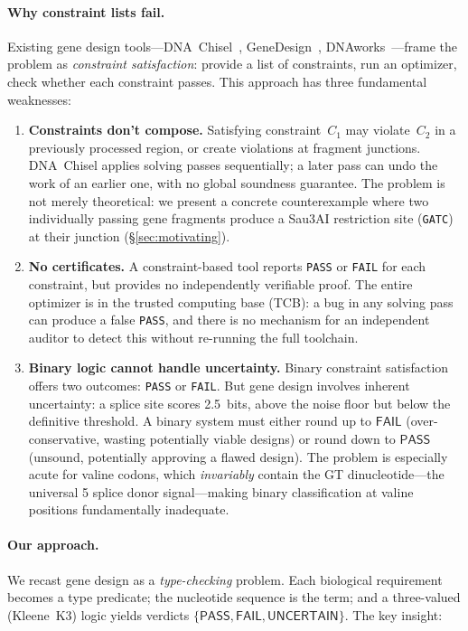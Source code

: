 \documentclass[acmsmall,review,anonymous]{acmart}
\newcommand{\PASS}{\ensuremath{\mathsf{PASS}}\xspace}
\newcommand{\FAIL}{\ensuremath{\mathsf{FAIL}}\xspace}
\newcommand{\UNCERTAIN}{\ensuremath{\mathsf{UNCERTAIN}}\xspace}
\begin{document}
\paragraph{Why constraint lists fail.}
Existing gene design tools---DNA~Chisel~\cite{piret2020dnachisel},
GeneDesign~\cite{richardson2006genedesign},
DNAworks~\cite{vandenbergh2015dnaworks}---frame the problem as
\emph{constraint satisfaction}: provide a list of constraints, run an
optimizer, check whether each constraint passes.
This approach has three fundamental weaknesses:

\begin{enumerate}[leftmargin=*,itemsep=1pt,topsep=2pt]
\item \textbf{Constraints don't compose.}
Satisfying constraint~$C_1$ may violate~$C_2$ in a previously
processed region, or create violations at fragment junctions.
DNA~Chisel applies solving passes sequentially; a later pass can undo
the work of an earlier one, with no global soundness guarantee.
The problem is not merely theoretical: we present a concrete
counterexample where two individually passing gene fragments produce a
Sau3AI restriction site (\texttt{GATC}) at their junction
(\S\ref{sec:motivating}).

\item \textbf{No certificates.}
A constraint-based tool reports \texttt{PASS} or \texttt{FAIL} for
each constraint, but provides no independently verifiable proof.
The entire optimizer is in the trusted computing base (TCB): a bug in
any solving pass can produce a false \texttt{PASS}, and there is no
mechanism for an independent auditor to detect this without re-running
the full toolchain.

\item \textbf{Binary logic cannot handle uncertainty.}
Binary constraint satisfaction offers two outcomes:
\texttt{PASS} or \texttt{FAIL}.
But gene design involves inherent uncertainty: a splice site scores
2.5~bits, above the noise floor but below the definitive threshold.
A binary system must either round up to \FAIL{} (over-conservative,
wasting potentially viable designs) or round down to \PASS{}
(unsound, potentially approving a flawed design).
The problem is especially acute for valine codons, which
\emph{invariably} contain the GT dinucleotide---the universal
5\textquotesingle{} splice donor signal---making binary classification
at valine positions fundamentally inadequate.
\end{enumerate}

\paragraph{Our approach.}
We recast gene design as a \emph{type-checking} problem.
Each biological requirement becomes a type predicate; the nucleotide
sequence is the term; and a three-valued (Kleene~K3) logic yields
verdicts $\{\PASS, \FAIL, \UNCERTAIN\}$.
The key insight:
\end{document}
